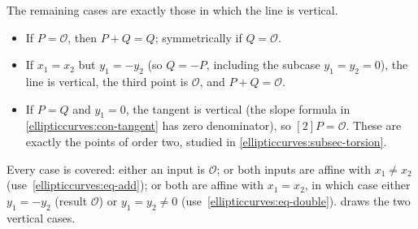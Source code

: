 \documentclass[11pt,a4paper]{article}
\theoremstyle{definition}
\theoremstyle{remark}
\begin{document}
The remaining cases are exactly those in which the line is vertical.
\begin{itemize}
  \item If \(P = \mathcal{O}\), then \(P + Q = Q\); symmetrically if
    \(Q = \mathcal{O}\).
  \item If \(x_1 = x_2\) but \(y_1 = -y_2\) (so \(Q = -P\), including
    the subcase \(y_1 = y_2 = 0\)), the line is vertical, the third
    point is \(\mathcal{O}\), and \(P + Q = \mathcal{O}\).
  \item If \(P = Q\) and \(y_1 = 0\), the tangent is vertical (the
    slope formula in \cref{ellipticcurves:con-tangent} has zero
    denominator), so \([2]P = \mathcal{O}\). These are exactly the
    points of order two, studied in
    \cref{ellipticcurves:subsec-torsion}.
\end{itemize}
Every case is covered: either an input is \(\mathcal{O}\); or both
inputs are affine with \(x_1 \neq x_2\)
(use~\eqref{ellipticcurves:eq-add}); or both are affine with
\(x_1 = x_2\), in which case either \(y_1 = -y_2\) (result
\(\mathcal{O}\)) or \(y_1 = y_2 \neq 0\)
(use~\eqref{ellipticcurves:eq-double}).
 draws the two vertical cases.
\end{document}
